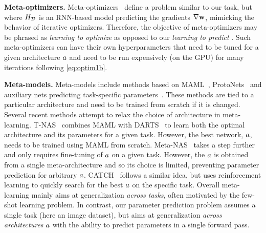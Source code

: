 \textbf{Meta-optimizers.} Meta-optimizers~\citep{andrychowicz2016learning,ravi2016optimization,metz2020tasks,kirsch2020meta,gomes2021meta} define a problem similar to our task, but where $H_{\mathcal{D}}$ is an RNN-based model predicting the gradients $\nabla \mathbf{w}$, mimicking the behavior of iterative optimizers. Therefore, the objective of meta-optimizers may be phrased as \emph{learning to optimize} as opposed to our \emph{learning to predict} \params.
Such meta-optimizers can have their own hyperparameters that need to be tuned for a given architecture $a$ and need to be run expensively (on the GPU) for many iterations following \eqref{eq:optim1b}.


\textbf{Meta-models.} Meta-models include methods based on MAML~\citep{finn2017model}, ProtoNets~\citep{snell2017prototypical} and auxiliary nets predicting task-specific parameters~\citep{romero2016diet,requeima2019fast,li2019lgm,bertinetto2016learning}. These methods are tied to a particular architecture and need to be trained from scratch if it is changed.
Several recent methods attempt to relax the choice of architecture in meta-learning. T-NAS~\citep{lian2020towards} combines MAML with DARTS~\citep{liu2018darts} to learn both the optimal architecture and its parameters for a given task. However, the best network, $a$, needs to be trained using MAML from scratch. Meta-NAS~\citep{elsken2020meta} takes a step further and only requires fine-tuning of $a$ on a given task. However, the $a$ is obtained from a single meta-architecture and so its choice is limited, preventing parameter prediction for arbitrary $a$. CATCH~\citep{chen2020catch} follows a similar idea, but uses reinforcement learning to quickly search for the best $a$ on the specific task.
Overall meta-learning mainly aims at generalization \textit{across tasks}, often motivated by the few-shot learning problem. In contrast, our parameter prediction problem assumes a single task (here an image dataset), but aims at generalization \textit{across architectures} $a$ with the ability to predict parameters in a single forward pass.


